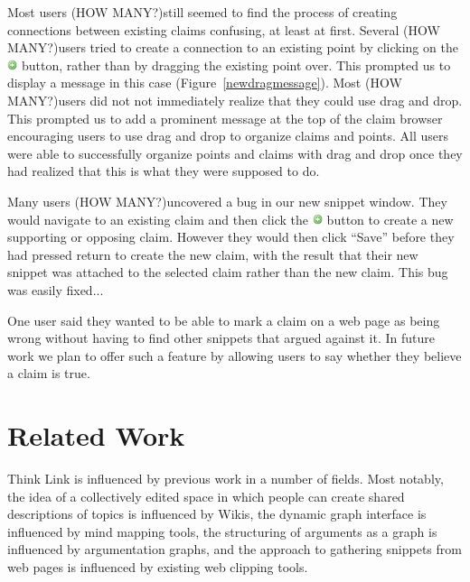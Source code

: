 \documentclass{chi2009}
\newcommand{\todo}[1]{}
\newcommand{\howmany}{{\color{red} (HOW MANY?)}}
\begin{document}
Most users \howmany still seemed to find the process of creating connections between existing claims confusing, at least at first. Several \howmany users tried to create a connection to an existing point by clicking on the \includegraphics[width=0.3cm]{../images/add.png} button, rather than by dragging the existing point over. This prompted us to display a message in this case (Figure~\ref{newdragmessage}). Most \howmany users did not not immediately realize that they could use drag and drop. This prompted us to add a prominent message at the top of the claim browser encouraging users to use drag and drop to organize claims and points. All users were able to successfully organize points and claims with drag and drop once they had realized that this is what they were supposed to do.

Many users \howmany uncovered a bug in our new snippet window. They would navigate to an existing claim and then click the \includegraphics[width=0.3cm]{../images/add.png} button to create a new supporting or opposing claim. However they would then click ``Save'' before they had pressed return to create the new claim, with the result that their new snippet was attached to the selected claim rather than the new claim. This bug was easily fixed...

One user said they wanted to be able to mark a claim on a web page as being wrong without having to find other snippets that argued against it. In future work we plan to offer such a feature by allowing users to say whether they believe a claim is true.

\todo{quote collection}

\section{Related Work}

Think Link is influenced by previous work in a number of fields. Most notably, the idea of a collectively edited space in which people can create shared descriptions of topics is influenced by Wikis, the dynamic graph interface is influenced by mind mapping tools, the structuring of arguments as a graph is influenced by argumentation graphs, and the approach to gathering snippets from web pages is influenced by existing web clipping tools.
\end{document}
